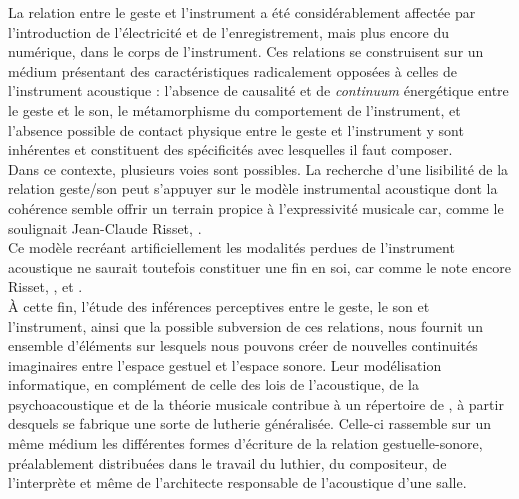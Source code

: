 \noindent La relation entre le geste et l'instrument a été considérablement affectée par l'introduction de l'électricité et de l'enregistrement, mais plus encore du numérique, dans le corps de l'instrument. Ces relations se construisent sur un médium présentant des caractéristiques radicalement opposées à celles de l'instrument acoustique : l'absence de causalité et de \textit{continuum} énergétique entre le geste et le son, le métamorphisme du comportement de l'instrument, et l'absence possible de contact physique entre le geste et l'instrument y sont inhérentes et constituent des spécificités avec lesquelles il faut composer.\\
\indent Dans ce contexte, plusieurs voies sont possibles. La recherche d'une lisibilité de la relation geste/son peut s'appuyer sur le modèle instrumental acoustique dont la cohérence semble offrir un terrain propice à l'expressivité musicale car, comme le soulignait Jean-Claude Risset,  \cite{risset_son_1992}.\\
\indent Ce modèle recréant artificiellement les modalités perdues de l'instrument acoustique ne saurait toutefois constituer une fin en soi, car comme le note encore Risset,  \cite{risset_propos_2010}, et  \cite{risset_son_1992}.\\
\indent À cette fin, l'étude des inférences perceptives entre le geste, le son et l'instrument, ainsi que la possible subversion de ces relations, nous fournit un ensemble d'éléments sur lesquels nous pouvons créer de nouvelles continuités imaginaires entre l'espace gestuel et l'espace sonore. Leur modélisation informatique, en complément de celle des lois de l'acoustique, de la psychoacoustique et de la théorie musicale contribue à un répertoire de , à partir desquels se fabrique une sorte de lutherie généralisée. Celle-ci rassemble sur un même médium les différentes formes d'écriture de la relation gestuelle-sonore, préalablement distribuées dans le travail du luthier, du compositeur, de l'interprète et même de l'architecte responsable de l'acoustique d'une salle.\\
